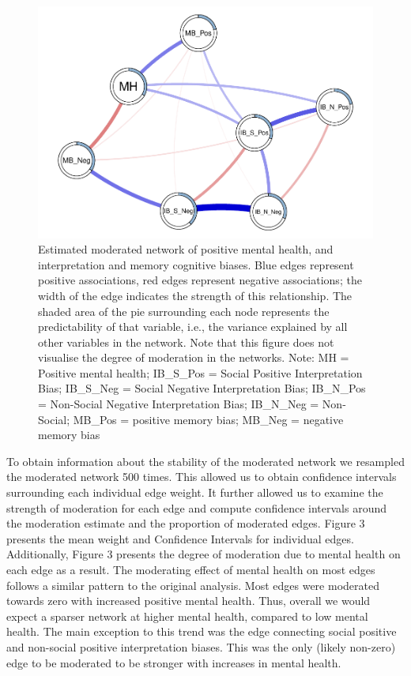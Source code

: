 \documentclass[man,floatsintext]{apa6}
\begin{document}
\begin{figure}
\centering
\includegraphics{script_files/figure-latex/unnamed-chunk-3-1.pdf}
\caption{\label{fig:unnamed-chunk-3}Estimated moderated network of positive mental health, and interpretation and memory cognitive biases. Blue edges represent positive associations, red edges represent negative associations; the width of the edge indicates the strength of this relationship. The shaded area of the pie surrounding each node represents the predictability of that variable, i.e., the variance explained by all other variables in the network. Note that this figure does not visualise the degree of moderation in the networks.
Note: MH = Positive mental health; IB\_S\_Pos = Social Positive Interpretation Bias; IB\_S\_Neg = Social Negative Interpretation Bias; IB\_N\_Pos = Non-Social Negative Interpretation Bias; IB\_N\_Neg = Non-Social; MB\_Pos = positive memory bias; MB\_Neg = negative memory bias}
\end{figure}

To obtain information about the stability of the moderated network we resampled the moderated network 500 times. This allowed us to obtain confidence intervals surrounding each individual edge weight. It further allowed us to examine the strength of moderation for each edge and compute confidence intervals around the moderation estimate and the proportion of moderated edges. Figure 3 presents the mean weight and Confidence Intervals for individual edges. Additionally, Figure 3 presents the degree of moderation due to mental health on each edge as a result. The moderating effect of mental health on most edges follows a similar pattern to the original analysis. Most edges were moderated towards zero with increased positive mental health. Thus, overall we would expect a sparser network at higher mental health, compared to low mental health. The main exception to this trend was the edge connecting social positive and non-social positive interpretation biases. This was the only (likely non-zero) edge to be moderated to be stronger with increases in mental health.
\end{document}
